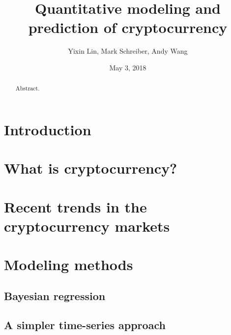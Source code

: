 \documentclass{article}
\title{Quantitative modeling and prediction of cryptocurrency}
\author{Yixin Lin, Mark Schreiber, Andy Wang}
\date{May 3, 2018}
\begin{document}
\maketitle

\begin{abstract}
    Abstract.
\end{abstract}

\tableofcontents

\newpage

\section{Introduction}

\section{What is cryptocurrency?}

\section{Recent trends in the cryptocurrency markets}

\section{Modeling methods}

\subsection{Bayesian regression}

\cite{shah2014bayesian}

\subsection{A simpler time-series approach}

\cite{amjad2017trading}

\newpage

\nocite{*}
{}

\end{document}
